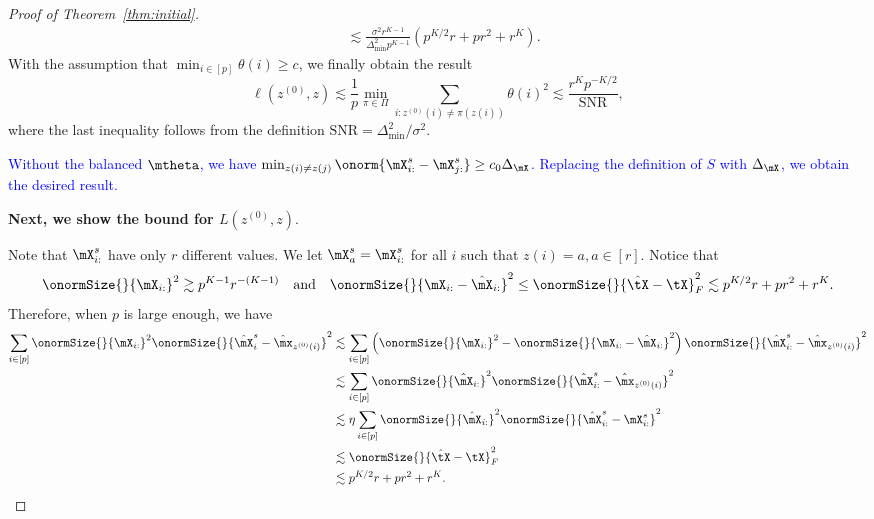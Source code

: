 \documentclass[lettersize,onecolumn,journal]{IEEEtran}
\theoremstyle{definition}
\theoremstyle{definition}
\newcommand{\of}[1]{\left(#1\right)}
\begin{document}
\begin{proof}[Proof of Theorem~\ref{thm:initial}]
\begin{align}
        & \lesssim \frac{\sigma^2 r^{K-1}}{ \Delta_{\min}^2  p^{K-1} } \of{ p^{K/2}r + pr^2 + r^K }.
    \end{align}
    With the assumption that $\min_{i \in [p]} \theta(i) \geq c$, we finally obtain the result
    \begin{equation}
        \ell(z^{(0)}, z) \lesssim \frac{1}{p}\min_{\pi \in \Pi} \sum_{i : z^{(0)}(i) \neq \pi(z(i))} \theta(i)^2 \lesssim \frac{r^K p^{-K/2} }{ \text{SNR} },
    \end{equation}
    where the last inequality follows from the definition $\text{SNR} = \Delta_{\min}^2/\sigma^2$.
    
    \textcolor{blue}{Without the balanced $\mtheta$, we have $\min_{z(i) \neq z(j)} \onorm{ \mX^s_{i:} - \mX^s_{j:} } \geq c_0  \Delta_{\mX}$. Replacing the definition of $S$ with $\Delta_{\mX}$, we obtain the desired result.}
    
    \textbf{Next, we show the bound for $L(z^{(0)}, z).$}
    
    Note that $\mX_{i:}^s$ have only $r$ different values. We let $\mX_a^s = \mX_{i:}^s$ for all $i$ such that $z(i) = a, a \in [r]$. 
    Notice that 
\begin{equation}
    \onormSize{}{\mX_{i:}}^2 \gtrsim p^{K-1} r^{-(K-1)} \quad \text{and} \quad \onormSize{}{\mX_{i:} - \hat \mX_{i:}}^2 \leq \onormSize{}{\hat \tX - \tX}_F^2 \lesssim  p^{K/2}r + pr^2 + r^K .
\end{equation}
Therefore, when $p$ is large enough, we have 
\begin{align}
    \sum_{i \in [p]} \onormSize{}{\mX_{i:}}^2 \onormSize{}{\hat \mX_i^s - \hat \mx_{z^{(0)}(i)}}^2 &\lesssim \sum_{i \in [p]} \of{\onormSize{}{\mX_{i:}}^2 - \onormSize{}{\mX_{i:} - \hat \mX_{i:}}^2} \onormSize{}{\hat \mX_{i:}^s - \hat \mx_{z^{(0)}(i)}}^2\\
   & \lesssim \sum_{i \in [p]} \onormSize{}{\hat \mX_{i:}}^2 \onormSize{}{\hat \mX_{i:}^s - \hat \mx_{z^{(0)}(i)}}^2 \\
   & \lesssim \eta  \sum_{i \in [p]} \onormSize{}{\hat \mX_{i:}}^2 \onormSize{}{\hat \mX_{i:}^s - \mX_{i:}^s}^2 \\
   & \lesssim \onormSize{}{\hat \tX - \tX}_F^2 \\
   & \lesssim p^{K/2}r + pr^2 + r^K .\label{eq:cor_1}
\end{align}


\end{proof}
\end{document}
